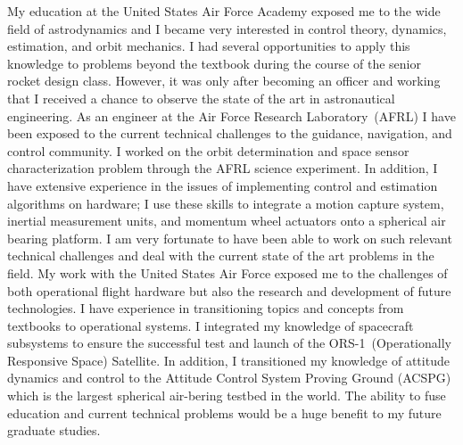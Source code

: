 \documentclass[12pt, oneside]{article}   	%
\begin{document}


My education at the United States Air Force Academy exposed me to the wide field of astrodynamics and I became very interested in control theory, dynamics, estimation, and orbit mechanics.
I had several opportunities to apply this knowledge to problems beyond the textbook during the course of the senior rocket design class.
However, it was only after becoming an officer and working that I received a chance to observe the state of the art in astronautical engineering.
As an engineer at the Air Force Research Laboratory~(AFRL) I have been exposed to the current technical challenges to the guidance, navigation, and control community.
I worked on the orbit determination and space sensor characterization problem through the AFRL science experiment.
In addition, I have extensive experience in the issues of implementing control and estimation algorithms on hardware; I use these skills to integrate a motion capture system, inertial measurement units, and momentum wheel actuators onto a spherical air bearing platform.
I am very fortunate to have been able to work on such relevant technical challenges and deal with the current state of the art problems in the field. 
My work with the United States Air Force exposed me to the challenges of both operational flight hardware but also the research and development of future technologies.
I have experience in transitioning topics and concepts from textbooks to operational systems. 
I integrated my knowledge of spacecraft subsystems to ensure the successful test and launch of the ORS-1~(Operationally Responsive Space) Satellite.
In addition, I transitioned my knowledge of attitude dynamics and control to the Attitude Control System Proving Ground (ACSPG) which is the largest spherical air-bering testbed in the world. 
The ability to fuse education and current technical problems would be a huge benefit to my future graduate studies.
\end{document}
